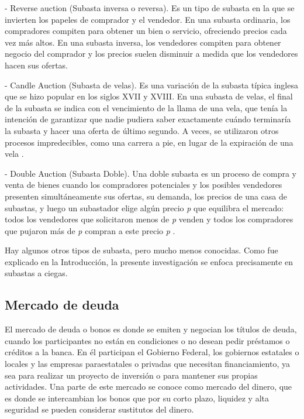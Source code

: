     - Reverse auction (Subasta inversa o reversa).
    Es un tipo de subasta en la que se invierten los papeles de comprador y el vendedor. En una subasta ordinaria, los compradores compiten 
    para obtener un bien o servicio, ofreciendo precios cada vez más altos. En una subasta inversa, los vendedores compiten para obtener 
    negocio del comprador y los precios suelen disminuir a medida que los vendedores hacen sus ofertas.

    - Candle Auction (Subasta de velas).
    Es una variación de la subasta típica inglesa que se hizo popular en los siglos XVII y XVIII. En una subasta de velas, el final 
    de la subasta se indica con el vencimiento de la llama de una vela, que tenía la intención de garantizar que nadie pudiera saber 
    exactamente cuándo terminaría la subasta y hacer una oferta de último segundo. A veces, se utilizaron otros procesos impredecibles, 
    como una carrera a pie, en lugar de la expiración de una vela \parencite{patten1970}.

    - Double Auction (Subasta Doble).
    Una doble subasta es un proceso de compra y venta de bienes cuando los compradores potenciales y los posibles vendedores presenten 
    simultáneamente sus ofertas, su demanda, los precios de una casa de subastas, y luego un subastador elige algún precio \textit{p} que 
    equilibra el mercado: todos los vendedores que solicitaron menos de \textit{p} venden y todos los compradores que pujaron más de 
    \textit{p} compran a este precio \textit{p} \parencite{friedman1992}.
    
    Hay algunos otros tipos de subasta, pero mucho menos conocidas. Como fue explicado en la Introducción, la presente investigación se 
    enfoca precisamente en subastas a ciegas.

  \subsection{Mercado de deuda} \hspace*{}

    El mercado de deuda o bonos es donde se emiten y negocian los títulos de deuda, cuando los participantes no están en condiciones o no 
    desean pedir préstamos o créditos a la banca. En él participan el Gobierno Federal, los gobiernos estatales o locales y las empresas 
    paraestatales o privadas que necesitan financiamiento, ya sea para realizar un proyecto de inversión o para mantener sus propias 
    actividades. Una parte de este mercado se conoce como mercado del dinero, que es donde se intercambian los bonos que por su corto 
    plazo, liquidez y alta seguridad se pueden considerar sustitutos del dinero.

